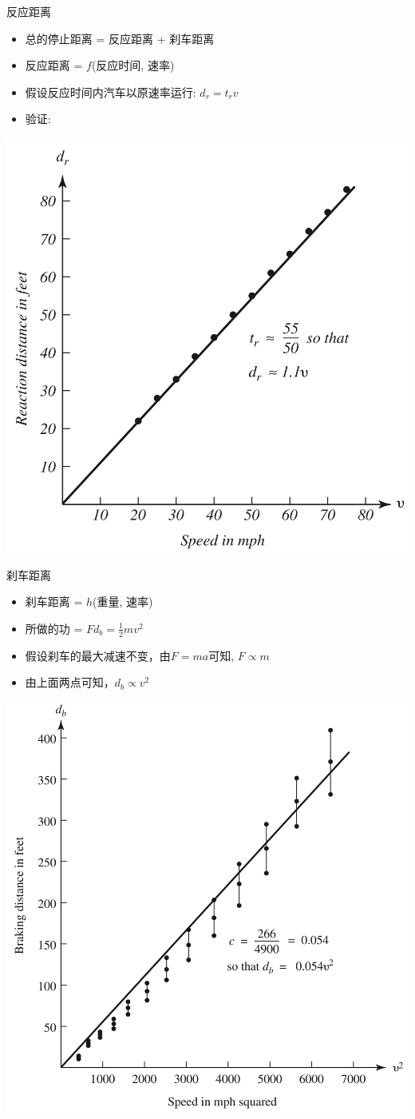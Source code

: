 \documentclass[UTF8, mathserif]{ctexbeamer}
\begin{document}
\begin{frame}{反应距离}

  \begin{itemize}
  \item 总的停止距离 = 反应距离 + 刹车距离
  \item 反应距离 = $f$(反应时间, 速率)
  \item 假设反应时间内汽车以原速率运行: $d_r = t_rv$
  \item 验证:
  \end{itemize}

  \begin{center}
    \includegraphics[width=.4\textwidth{}]{dr.png}
  \end{center}
\end{frame}

\begin{frame}{刹车距离}

  \begin{itemize}
  \item 刹车距离 = $h$(重量, 速率)
  \item 所做的功 = $Fd_b=\frac{1}{2}mv^2$
  \item 假设刹车的最大减速不变，由$F=ma$可知, $F \propto m$
  \item 由上面两点可知，$d_b \propto v^2$
  \end{itemize}

  \begin{center}
    \includegraphics[width=.4\textwidth{}]{db.png}
  \end{center}
  
\end{frame}
\end{document}
